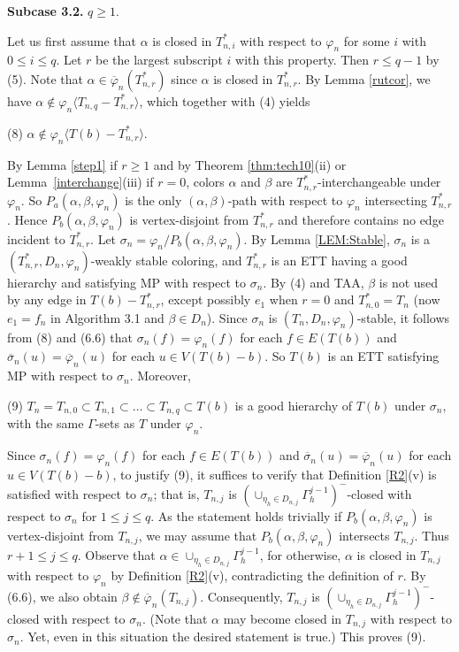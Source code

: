 \documentclass[11pt]{article}
\newcommand{\phibar}{\overline{\varphi}}
\newcommand{\phiv}{\varphi}
\begin{document}
{\bf Subcase 3.2.} $q\ge 1$. 	

Let us first assume that $\alpha$ is closed in $T^*_{n,i}$ with respect to $\varphi_n$ for some $i$ with
$0\le i \le q$. Let $r$ be the largest subscript $i$ with this property. Then $r\le q-1$ by (5). Note that $\alpha\in\phibar_n(T^*_{n,r})$ since $\alpha$ is closed in $T^*_{n,r}$.
By Lemma \ref{rutcor}, we have $\alpha \notin \varphi_n \langle T_{n,q}- T_{n,r}^* \rangle$,  which together 
with (4) yields 

(8) $\alpha\notin \phiv_n \langle T(b)-T_{n,r}^* \rangle$. 

By Lemma \ref{step1} if $r \ge 1$ and by Theorem \ref{thm:tech10}(ii) or Lemma~\ref{interchange}(iii) if $r=0$, colors  
$\alpha$ and $\beta$ are $T_{n,r}^*$-interchangeable under $\varphi_n$. So $P_{a}(\alpha,\beta,\varphi_n)$ is the only $(\alpha,\beta)$-path with respect to $\varphi_n$ intersecting $T_{n,r}^*$. Hence $P_{b}(\alpha,\beta,\varphi_n)$ is 
vertex-disjoint from $T_{n,r}^*$ and therefore contains no edge incident to  $T_{n,r}^*$. Let $\sigma_n=\varphi_n/P_{b}(\alpha,\beta,\varphi_n)$. By Lemma \ref{LEM:Stable}, $\sigma_n$ is a $(T_{n,r}^*, D_n,\varphi_n)$-weakly stable coloring, and $T_{n,r}^*$ is an ETT having a good hierarchy and satisfying MP with respect to $\sigma_n$. By (4)
and TAA, $\beta$ is not used by any edge in $T(b) -  T_{n,r}^*$, except possibly $e_1$ when $r=0$ and $T_{n,0}^*=T_n$ 
(now $e_1=f_n$ in Algorithm 3.1 and $\beta \in D_n$). Since $\sigma_n$ is $(T_n, D_n,\varphi_n)$-stable,
it follows from (8) and (6.6) that $\sigma_n(f)=\varphi_n(f)$ for each $f\in E(T(b))$ and $\overline{\sigma}_n(u)=
\phibar_n(u)$ for each $u\in V(T(b)-b)$. So $T(b)$ is an ETT satisfying MP with respect to $\sigma_n$. Moreover, 

(9) $T_n=T_{n,0} \subset T_{n,1}  \subset \ldots \subset T_{n,q} \subset T(b)$ is a good hierarchy of $T(b)$ under $\sigma_n$, 
with the same $\Gamma$-sets as $T$ under $\varphi_n$.

Since $\sigma_n(f)=\varphi_n(f)$ for each $f\in E(T(b))$ and $\overline{\sigma}_n(u)=\phibar_n(u)$ for each $u\in V(T(b)-b)$, 
to justify (9), it suffices to verify that Definition \ref{R2}(v) is satisfied with respect to $\sigma_n$; that is,
$T_{n,j}$ is $(\cup_{\eta_h\in D_{n,j}}\Gamma^{j-1}_h)^-$-closed with respect to $\sigma_n$ for $1\le j \le q$. 
As the statement holds trivially if $P_{b}(\alpha,\beta,\varphi_n)$ is vertex-disjoint from $T_{n,j}$, we may
assume that $P_b(\alpha, \beta, \varphi_n)$ intersects $T_{n,j}$. Thus $r+1\le j\le q$. Observe that $\alpha \in \cup_{\eta_h\in D_{n,j}} \Gamma^{j-1}_h$, for otherwise, $\alpha$ is closed in $T_{n,j}$ with respect to $\varphi_n$ by Definition \ref{R2}(v),
contradicting the definition of $r$. By (6.6), we also obtain $\beta \notin \overline{\varphi}_n(T_{n,j})$. Consequently,
$T_{n,j}$ is $(\cup_{\eta_h\in D_{n,j}}\Gamma^{j-1}_h)^-$-closed with respect to $\sigma_n$. (Note that $\alpha$ may 
become closed in $T_{n,j}$ with respect to $\sigma_n$. Yet, even in this situation the desired statement is true.)
This proves (9).  
\end{document}

